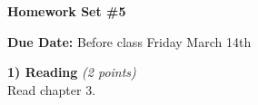 

\def\xyprime{\ensuremath{\begin{pmatrix} x' \\ y' \end{pmatrix}}}



\thispagestyle{fancy}






\begin{center}
{\huge \textbf{Homework Set \#5}}
\large

{\textbf{ Due Date:} Before class Friday March 14th  }
\end{center}

\textbf{1) Reading } \hfill \textit{(2 points)}\\
Read chapter 3.

\vspace*{0.25in}


